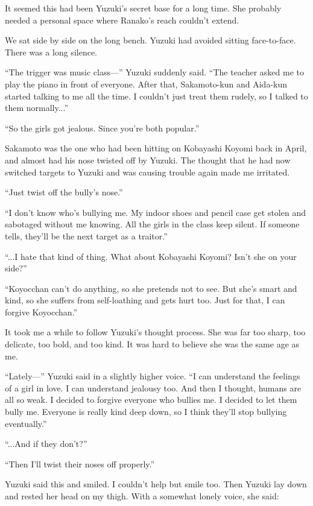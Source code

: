 \documentclass[
    a4paper,
    12pt,
    twoside,
    openany,
    UTF8,
    fontset=windows
]{ctexbook}
\begin{document}
It seemed this had been Yuzuki's secret base for a long time. She probably needed a personal space where Ranako's reach couldn't extend.

We sat side by side on the long bench. Yuzuki had avoided sitting face-to-face. There was a long silence.

``The trigger was music class---'' Yuzuki suddenly said. ``The teacher asked me to play the piano in front of everyone. After that, Sakamoto-kun and Aida-kun started talking to me all the time. I couldn't just treat them rudely, so I talked to them normally...''

``So the girls got jealous. Since you're both popular.''

Sakamoto was the one who had been hitting on Kobayashi Koyomi back in April, and almost had his nose twisted off by Yuzuki. The thought that he had now switched targets to Yuzuki and was causing trouble again made me irritated.

``Just twist off the bully's nose.''

``I don't know who's bullying me. My indoor shoes and pencil case get stolen and sabotaged without me knowing. All the girls in the class keep silent. If someone tells, they'll be the next target as a traitor.''

``...I hate that kind of thing. What about Kobayashi Koyomi? Isn't she on your side?''

``Koyocchan can't do anything, so she pretends not to see. But she's smart and kind, so she suffers from self-loathing and gets hurt too. Just for that, I can forgive Koyocchan.''

It took me a while to follow Yuzuki's thought process. She was far too sharp, too delicate, too bold, and too kind. It was hard to believe she was the same age as me.

``Lately---'' Yuzuki said in a slightly higher voice. ``I can understand the feelings of a girl in love. I can understand jealousy too. And then I thought, humans are all so weak. I decided to forgive everyone who bullies me. I decided to let them bully me. Everyone is really kind deep down, so I think they'll stop bullying eventually.''

``...And if they don't?''

``Then I'll twist their noses off properly.''

Yuzuki said this and smiled. I couldn't help but smile too. Then Yuzuki lay down and rested her head on my thigh. With a somewhat lonely voice, she said:
\end{document}
